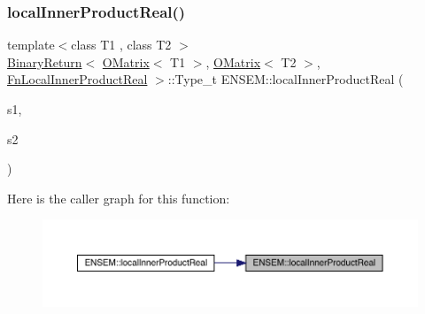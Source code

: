 \subsubsection{\texorpdfstring{localInnerProductReal()}{localInnerProductReal()}\hspace{0.1cm}{\footnotesize\ttfamily [1/3]}}
{\footnotesize\ttfamily template$<$class T1 , class T2 $>$ \\
\mbox{\hyperlink{structENSEM_1_1BinaryReturn}{Binary\+Return}}$<$ \mbox{\hyperlink{classENSEM_1_1OMatrix}{O\+Matrix}}$<$ T1 $>$, \mbox{\hyperlink{classENSEM_1_1OMatrix}{O\+Matrix}}$<$ T2 $>$, \mbox{\hyperlink{structENSEM_1_1FnLocalInnerProductReal}{Fn\+Local\+Inner\+Product\+Real}} $>$\+::Type\+\_\+t E\+N\+S\+E\+M\+::local\+Inner\+Product\+Real (\begin{DoxyParamCaption}\item[{const \mbox{\hyperlink{classENSEM_1_1OMatrix}{O\+Matrix}}$<$ T1 $>$ \&}]{s1,  }\item[{const \mbox{\hyperlink{classENSEM_1_1OMatrix}{O\+Matrix}}$<$ T2 $>$ \&}]{s2 }\end{DoxyParamCaption})\hspace{0.3cm}{\ttfamily [inline]}}

Here is the caller graph for this function\+:\nopagebreak
\begin{figure}[H]
\begin{center}
\leavevmode
\includegraphics[width=350pt]{d8/d55/group__obsmatrix_gacc55b39949beec3cc3690b3c892801d2_icgraph}
\end{center}
\end{figure}
\mbox{\label{group__obsmatrix_ga3b363fa48471a9d3fc6da5cbfcb21fb5}} 
